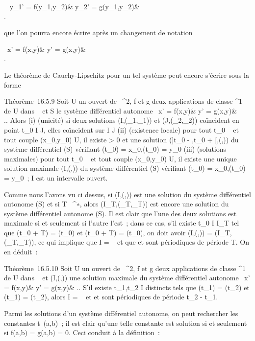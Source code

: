 \left \ \cases
y_1' = f(y_1,y_2)& \cr
y_2' = g(y_1,y_2)&\\ 
\right .

que l'on pourra encore écrire après un changement de notation

\left \ \cases x' =
f(x,y)& \cr y' = g(x,y)&\\  \right .

Le théorème de Cauchy-Lipschitz pour un tel système peut encore s'écrire
sous la forme

Théorème~16.5.9 Soit U un ouvert de ~^2, f et g deux
applications de classe ^1 de U dans ~ et S le système
différentiel autonome \left \
\cases x' = f(x,y)& \cr y' = g(x,y)&\\
 \right .. Alors (i) (unicité) si deux solutions
(I,(\phi_1,\psi_1)) et (J,(\phi_2,\psi_2))
coïncident en point t_0 \in I \bigcap J, elles coïncident sur I \bigcap J
(ii) (existence locale) pour tout t_0 \in \mathbb{R}~ et tout couple
(x_0,y_0) \in U, il existe \eta > 0 et une
solution (]t_0 - \eta,t_0 + \eta[,(\phi,\psi)) du système
différentiel (S) vérifiant \phi(t_0) =
x_0,\psi(t_0) = y_0 (iii) (solutions maximales)
pour tout t_0 \in {}~ et tout couple (x_0,y_0) \in
U, il existe une unique solution maximale (I,(\phi,\psi)) du système
différentiel (S) vérifiant \phi(t_0) =
x_0,\psi(t_0) = y_0~; I est un intervalle
ouvert.

Comme nous l'avons vu ci dessus, si (I,(\phi,\psi)) est une solution du
système différentiel autonome (S) et si T \in \mathbb{R}~^∗, alors
(I_T,(\phi_T,\psi_T)) est encore une solution du
système différentiel autonome (S). Il est clair que l'une des deux
solutions est maximale si et seulement si l'autre l'est~; dans ce cas,
s'il existe t_0 \in I \bigcap I_T tel que \phi(t_0 + T)
= \phi(t_0) et \psi(t_0 + T) = \psi(t_0), on doit
avoir (I,(\phi,\psi)) = (I_T,(\phi_T,\psi_T)), ce qui
implique que I = ~ et que \phi et \psi sont périodiques de période T. On en
déduit~:

Théorème~16.5.10 Soit U un ouvert de ~^2, f et g deux
applications de classe ^1 de U dans \mathbb{R}~ et (I,(\phi,\psi)) une
solution maximale du système différentiel autonome \left
\ \cases x' = f(x,y)&
\cr y' = g(x,y)&  \right .. S'il existe
t_1,t_2 \in I distincts tels que \phi(t_1) =
\phi(t_2) et \psi(t_1) = \psi(t_2), alors I = ~ et \phi
et \psi sont périodiques de période t_2 - t_1.

Parmi les solutions d'un système différentiel autonome, on peut
rechercher les constantes t\mapsto~(a,b)~; il est
clair qu'une telle constante est solution si et seulement si f(a,b) =
g(a,b) = 0. Ceci conduit à la définition~:

